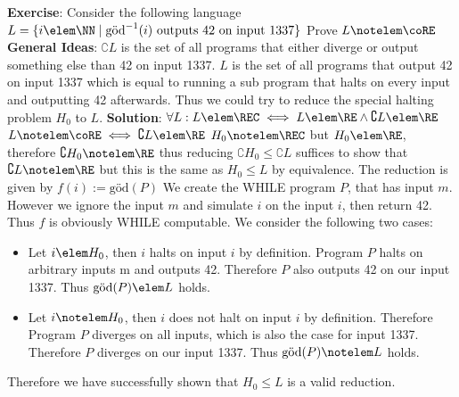     \textbf{Exercise}:\newline
    Consider the following language $L = \{ i \elem \NN \mid \text{göd}^{-1}(i) \text{ outputs 42 on input 1337} \}$\newline
    Prove $L \notelem \coRE$\newline\newline
    \textbf{General Ideas}:\newline
    $\complement{L}$ is the set of all programs that either diverge or output something else than 42 on input 1337.\newline
    $L$ is the set of all programs that output 42 on input 1337 which is equal to running a sub program that halts on every input and outputting 42 afterwards.
    Thus we could try to reduce the special halting problem $H_0$ to $L$.\newline\newline
    \textbf{Solution}:\newline
    $\forall L: L \elem \REC \iff L \elem \RE \wedge \complement{L} \elem \RE$\newline
    $L \notelem \coRE \iff \complement{L} \elem \RE$\newline\newline
    $H_0 \notelem \REC$ but $H_0 \elem \RE$, therefore $\complement{H_0} \notelem \RE$ thus reducing $\complement{H_0} \leq \complement{L}$ suffices to show that
    $\complement{L} \notelem \RE$ but this is the same as $H_0 \leq L$ by equivalence.\newline\newline
    The reduction is given by $f(i) := \text{göd}(P)$\newline
    We create the WHILE program $P$, that has input $m$. However we ignore the input $m$ and simulate $i$ on the input $i$, then return 42.
    Thus $f$ is obviously WHILE computable.\newline\newline
    We consider the following two cases:
    \begin{itemize}
        \item Let $i \elem H_0$, then $i$ halts on input $i$ by definition. Program $P$ halts on arbitrary inputs m and outputs 42.
        Therefore $P$ also outputs 42 on our input 1337.\newline
        Thus $\text{göd}(P) \elem L$ holds.
        \item Let $i \notelem H_0$, then $i$ does not halt on input $i$ by definition. Therefore Program $P$ diverges on all inputs, which is also the case for input 1337.\newline
        Therefore $P$ diverges on our input 1337.\newline
        Thus $\text{göd}(P) \notelem L$ holds.
    \end{itemize}
    Therefore we have successfully shown that $H_0 \leq L$ is a valid reduction.
